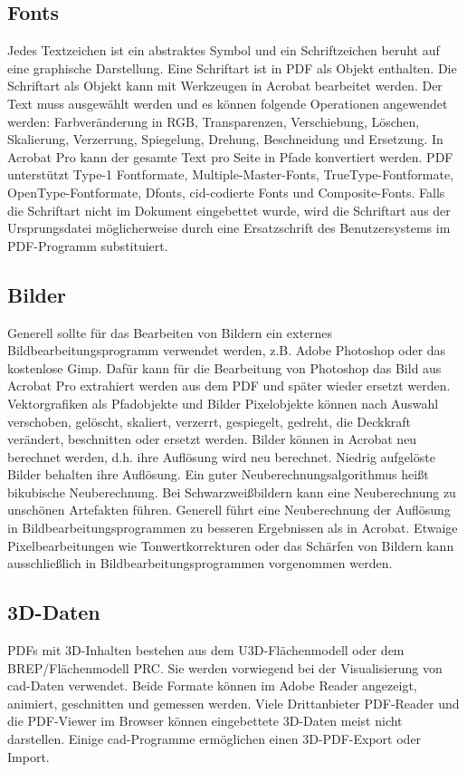 \subsection{Fonts}
Jedes Textzeichen ist ein abstraktes Symbol und ein Schriftzeichen beruht auf eine graphische Darstellung. Eine Schriftart ist in PDF als Objekt enthalten. Die Schriftart als Objekt kann mit Werkzeugen in Acrobat bearbeitet werden. Der Text muss ausgewählt werden und es können folgende Operationen angewendet werden: Farbveränderung in RGB, Transparenzen, Verschiebung, Löschen, Skalierung, Verzerrung, Spiegelung, Drehung, Beschneidung und Ersetzung. In Acrobat Pro kann der gesamte Text pro Seite in Pfade konvertiert werden. PDF unterstützt Type-1 Fontformate, Multiple-Master-Fonts, TrueType-Fontformate, OpenType-Fontformate, Dfonts, \gls{cid}-codierte Fonts und Composite-Fonts. Falls die Schriftart nicht im Dokument eingebettet wurde, wird die Schriftart aus der Ursprungsdatei möglicherweise durch eine Ersatzschrift des Benutzersystems im PDF-Programm substituiert. \cite{schneeberger}

\subsection{Bilder}
Generell sollte für das Bearbeiten von Bildern ein externes Bildbearbeitungsprogramm verwendet werden, z.B. Adobe Photoshop oder das kostenlose Gimp. Dafür kann für die Bearbeitung von Photoshop das Bild aus Acrobat Pro extrahiert werden aus dem PDF und später wieder ersetzt werden. Vektorgrafiken als Pfadobjekte und Bilder Pixelobjekte können nach Auswahl verschoben, gelöscht, skaliert, verzerrt, gespiegelt, gedreht, die Deckkraft verändert, beschnitten oder ersetzt werden. \cite{schneeberger} Bilder können in Acrobat neu berechnet werden, d.h. ihre Auflösung wird neu berechnet. Niedrig aufgelöste Bilder behalten ihre Auflösung. Ein guter Neuberechnungsalgorithmus heißt bikubische Neuberechnung. Bei Schwarzweißbildern kann eine Neuberechnung zu unschönen Artefakten führen. \cite{buehler} Generell führt eine Neuberechnung der Auflösung in Bildbearbeitungsprogrammen zu besseren Ergebnissen als in Acrobat. Etwaige Pixelbearbeitungen wie Tonwertkorrekturen oder das Schärfen von Bildern kann ausschließlich in Bildbearbeitungsprogrammen vorgenommen werden. 

\subsection{3D-Daten}
PDFs mit 3D-Inhalten bestehen aus dem U3D-Flächenmodell oder dem BREP/Flächenmodell PRC. Sie werden vorwiegend bei der Visualisierung von \gls{cad}-Daten verwendet. Beide Formate können im Adobe Reader angezeigt, animiert, geschnitten und gemessen werden. Viele Drittanbieter PDF-Reader und die PDF-Viewer im Browser können eingebettete 3D-Daten meist nicht darstellen. Einige \gls{cad}-Programme ermöglichen einen 3D-PDF-Export oder Import. \cite{wiki-pdf-de}

